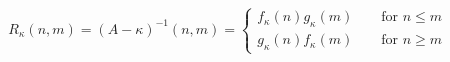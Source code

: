 \begin{equation}
R_\kappa(n,m)= (A-\kappa)^{-1}(n,m) =
\begin{cases} 
f_\kappa(n) g_\kappa(m) \qquad\text{for $n\le m$} \\
g_\kappa(n) f_\kappa(m) \qquad\text{for $n\ge m$}
\end{cases}
\end{equation}

